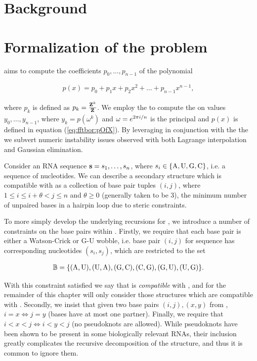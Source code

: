 \section{Background}
\label{sec:fftbor:bkgrnd}

\section{Formalization of the problem}
\label{sec:fftbor:formal}

\fftbor aims to compute the coefficients $p_0,\dots,p_{n-1}$ of the polynomial

\begin{align}
\label{eq:fftbor:pOfX}
p(x) = p_0 + p_1 x + p_2 x^2 + \dots + p_{n-1} x^{n-1},
\end{align}

where $p_k$ is defined as $p_k = \frac{{\bf Z}^{k}_{}}{{\bf Z}^{}_{}}$. We employ the \fft to compute
the \idft on values $y_0,\dots,y_{n-1}$, where
$y_k = p(\omega^k)$ and $\omega = e^{2 \pi i/n}$ is the principal \nRoU and $p(x)$ is defined in
equation (\ref{eq:fftbor:pOfX}). By leveraging
\nRoUs in conjunction with the \idft the we subvert numeric instability
issues observed with both Lagrange interpolation and Gaussian elimination.

Consider an RNA sequence ${\bf s} = s_1,\dots,s_n$, where
$s_i \in \{\text{A,\,U,\,G,\,C}\}$, i.e. a sequence of nucleotides. We can describe a
secondary structure \str which is compatible with \seq as a collection of
base pair tuples $(i,j)$, where $1 \le i \le i+\theta < j \le n$ and
$\theta \ge 0$ (generally taken to be 3), the minimum number of unpaired bases
in a hairpin loop due to steric constraints.

To more simply develop the underlying recursions for \fftbor, we introduce a
number of constraints on the base pairs within \str. Firstly, we require that
each base pair is either a Watson-Crick or G-U wobble, i.e. base pair $(i,j)$
for sequence \seq has corresponding nucleotides $(s_i,s_j)$, which are
restricted to the set

\begin{align}
\label{eq:fftbor:validBP}
\bpSet =
\{\text{(A,\,U),\,(U,\,A),\,(G,\,C),\,(C,\,G),\,(G,\,U),\,(U,\,G)}\}.
\end{align}

With
this constraint satisfied we say that \str is {\em compatible} with \seq, and
for the remainder of this chapter will only consider those structures which are
compatible with \seq.
Secondly, we insist that given two base pairs $(i,j), (x,y)$ from \str,
$i=x \iff j=y$ (bases have at most one partner). Finally, we require that
$i<x<j \iff i<y<j$ (no pseudoknots are allowed). While pseudoknots have been
shown to be present in some biologically relevant RNAs, their inclusion greatly
complicates the recursive decomposition of the structure, and thus it is common
to ignore them.

